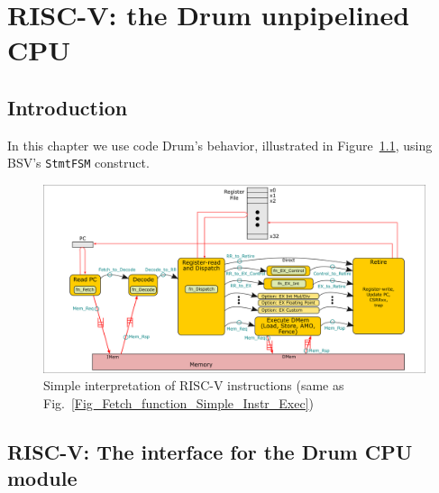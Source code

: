 

\chapter{RISC-V: the Drum unpipelined CPU}


\setcounter{page}{1}
\renewcommand{\thepage}{\arabic{chapter}-\arabic{page}}

\label{ch_Drum_code}


\section{Introduction}

In this chapter we use code Drum's behavior, illustrated in
Figure~\ref{Fig_Drum_Instr_Exec}, using BSV's \verb|StmtFSM|
construct.
\begin{figure}[htbp]
  \centerline{\includegraphics[width=6in,angle=0]{Figures/Fig_Instr_Exec_w_structs}}
  \caption{\label{Fig_Drum_Instr_Exec}
           Simple interpretation of RISC-V instructions
	   (same as Fig.~\ref{Fig_Fetch_function_Simple_Instr_Exec})}
\end{figure}


\section{RISC-V: The interface for the Drum CPU module}

